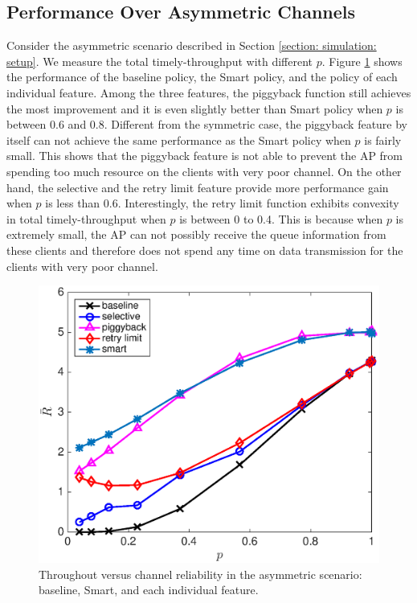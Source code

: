 \documentclass{article}
\begin{document}
\subsection{Performance Over Asymmetric Channels}
Consider the asymmetric scenario described in Section \ref{section: simulation: setup}. We measure the total timely-throughput with different $p$.  Figure \ref{sim: asym: three features} shows the performance of the baseline policy, the Smart policy, and the policy of each individual feature. Among the three features, the piggyback function still achieves the most improvement and it is even slightly better than Smart policy when $p$ is between 0.6 and 0.8. Different from the symmetric case, the piggyback feature by itself can not achieve the same performance as the Smart policy when $p$ is fairly small. This shows that the piggyback feature is not able to prevent the AP from spending too much resource on the clients with very poor channel. On the other hand, the selective and the retry limit feature provide more performance gain when $p$ is less than 0.6. Interestingly, the retry limit function exhibits convexity in total timely-throughput when $p$ is between 0 to 0.4. This is because when $p$ is extremely small, the AP can not possibly receive the queue information from these clients and therefore does not spend any time on data transmission for the clients with very poor channel.

\begin{figure}[htbp]
\centering
\includegraphics[scale=0.5]{3policycompare_asym.eps}
\caption{Throughout versus channel reliability in the asymmetric scenario: baseline, Smart, and each individual feature.}
\label{sim: asym: three features}
\end{figure}
\end{document}
